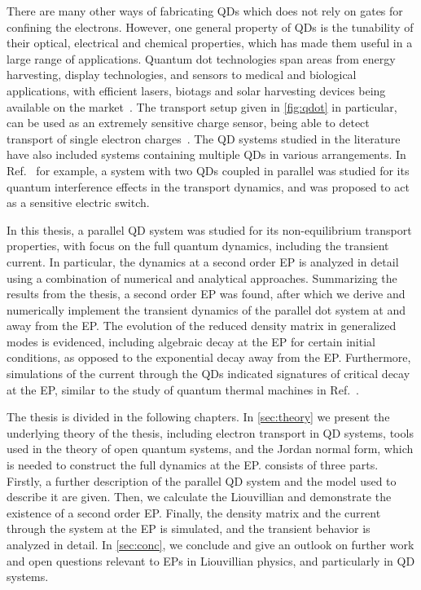 \documentclass[../main.tex]{subfiles}
\begin{document}
There are many other ways of fabricating QDs which does not rely on gates for confining the electrons. However, one general property of QDs is the tunability of their optical, electrical and chemical properties, which has made them useful in a large range of applications. Quantum dot technologies span areas from energy harvesting, display technologies, and sensors to medical and biological applications, with efficient lasers, biotags and solar harvesting devices being available on the market~\cite{qdotrev}. The transport setup given in \cref{fig:qdot} in particular, can be used as an extremely sensitive charge sensor, being able to detect transport of single electron charges~\cite{etrans}. The QD systems studied in the literature have also included systems containing multiple QDs in various arrangements. In Ref.~\cite{doubledot} for example, a system with two QDs coupled in parallel was studied for its quantum interference effects in the transport dynamics, and was proposed to act as a sensitive electric switch.

In this thesis, a parallel QD system was studied for its non-equilibrium transport properties, with focus on the full quantum dynamics, including the transient current. In particular, the dynamics at a second order EP is analyzed in detail using a combination of numerical and analytical approaches. Summarizing the results from the thesis, a second order EP was found, after which we derive and numerically implement the transient dynamics of the parallel dot system at and away from the EP. The evolution of the reduced density matrix in generalized modes is evidenced, including algebraic decay at the EP for certain initial conditions, as opposed to the exponential decay away from the EP. Furthermore, simulations of the current through the QDs indicated signatures of critical decay at the EP, similar to the study of quantum thermal machines in Ref.~\cite{thermal}.



The thesis is divided in the following chapters. In \cref{sec:theory} we present the underlying theory of the thesis, including electron transport in QD systems, tools used in the theory of open quantum systems, and the Jordan normal form, which is needed to construct the full dynamics at the EP.  consists of three parts. Firstly, a further description of the parallel QD system and the model used to describe it are given. Then, we calculate the Liouvillian and demonstrate the existence of a second order EP. Finally, the density matrix and the current through the system at the EP is simulated, and the transient behavior is analyzed in detail. In \cref{sec:conc}, we conclude and give an outlook on further work and open questions relevant to EPs in Liouvillian physics, and particularly in QD systems.
\end{document}
